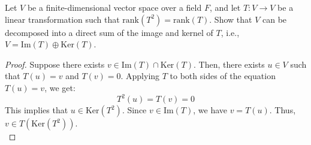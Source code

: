 \documentclass[openany]{book}
\begin{document}
\begin{exercise}
    Let $V$ be a finite-dimensional vector space over a field $F$, and let $T: V \to V$ be a linear transformation such that $\text{rank}(T^2) = \text{rank}(T)$. Show that $V$ can be decomposed into a direct sum of the image and kernel of $T$, i.e., $V = \text{Im}(T) \oplus \text{Ker}(T)$.
\end{exercise}
\begin{proof}
    Suppose there exists \( v \in \text{Im}(T) \cap \text{Ker}(T) \). Then, there exists \( u \in V \) such that \( T(u) = v \) and \( T(v) = 0 \). Applying \( T \) to both sides of the equation \( T(u) = v \), we get:
    \[T^2(u) = T(v) = 0\]
    This implies that \( u \in \text{Ker}(T^2) \). Since \( v \in \text{Im}(T) \), we have \( v = T(u) \). Thus, \( v \in T(\text{Ker}(T^2)) \). \\
    
\end{proof}
\end{document}
